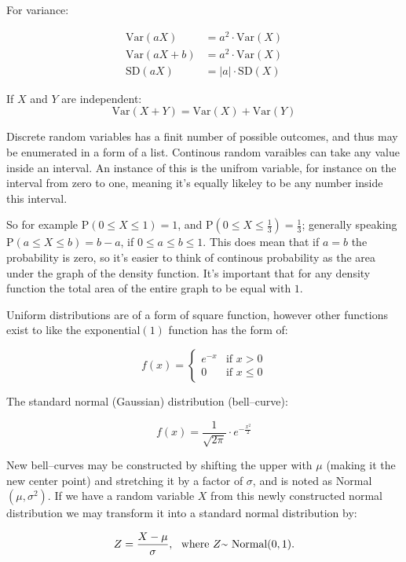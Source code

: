 For variance:



\begin{align*}
 \mbox{Var}(aX) &= a^2\cdot\mbox{Var}(X) \\ 
 \mbox{Var}(aX+b) &= a^2\cdot\mbox{Var}(X) \\
  \mbox{SD}(aX) &= |a|\cdot\mbox{SD}(X) 
\end{align*}

If $X$ and $Y$ are independent:
\[ \mbox{Var}(X+Y) = \mbox{Var}(X) + \mbox{Var}(Y) 
\]

Discrete random variables has a finit number of possible outcomes, and thus may
be enumerated in a form of a list. Continous random varaibles can take any value
inside an interval. An instance of this is the unifrom variable, for instance on
the interval from zero to one, meaning it's equally likeley to be any number
inside this interval. 

So for example P$(0 \leq X \leq 1) = 1$, and P$(0 \leq X \leq \frac{1}{3}) =
\frac{1}{3}$; generally speaking P$(a \leq X \leq b) = b - a$, if $0 \leq a \leq
b \leq 1$. This does mean that if $a=b$ the probability is zero, so it's easier
to think of continous probability as the area under the graph of the density
function. It's important that for any density function the total area of the
entire graph to be equal with $1$.

Uniform distributions are of a form of square function, however other functions
exist to like the exponential$(1)$ function has the form of: 

\[
 f(x) =
  \begin{cases}
   e^{-x} & \text{if } x > 0 \\
   0       & \text{if } x \leq 0
  \end{cases}
\]

The standard normal (Gaussian) distribution (bell--curve): 

\[ f(x)=\frac{1}{\sqrt{2\pi}} \cdot e ^{-\frac{x^2}{2}}\]

New bell--curves may be constructed by shifting the upper with $\mu$ (making it
the new center point) and stretching it by a factor of $\sigma$, and is noted as
Normal$(\mu, \sigma^2)$. If we have a random variable $X$ from this newly
constructed normal distribution we may transform it into a standard normal
distribution by: 

\[ 
Z = \frac{X - \mu}{\sigma} , \mbox{~ where $Z ${\raise.17ex\hbox{$\scriptstyle\mathtt{\sim}$}} Normal} (0,1). 
\]

